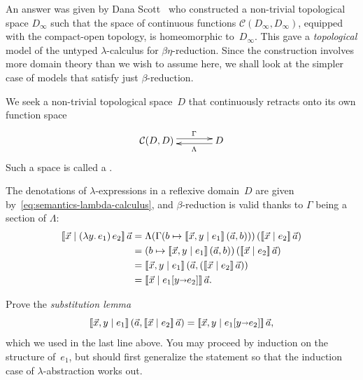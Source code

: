 An answer was given by Dana Scott~ who
constructed a non-trivial topological space $D_\infty$ such that the
space of continuous functions $\mathcal{C}(D_\infty, D_\infty)$,
equipped with the compact-open topology, is homeomorphic
to~$D_\infty$. This gave a \emph{topological} model of the untyped
$\lambda$-calculus for $\beta\eta$-reduction. Since the construction
involves more domain theory than we wish to assume here, we shall look
at the simpler case of models that satisfy just $\beta$-reduction.

We seek a non-trivial topological space~$D$ that continuously retracts onto its own function space
%
\begin{equation}
  \label{eq:section-retraction-D}
  \xymatrix{
    **[l]{\mathcal{C}(D, D)}
    \ar@<+0.25em>[r]^{\Gamma}
    &
    {D}
    \ar@<+0.25em>[l]^{\Lambda}
  }
\end{equation}
%
Such a space is called a .


The denotations of $\lambda$-expressions in a reflexive domain~$D$ are given by~\eqref{eq:semantics-lambda-calculus}, and $\beta$-reduction is valid thanks to $\Gamma$ being a section of $\Lambda$:
%
\begin{align*}
  \sem{\vec{x} \ctx (\lam{y} e_1) \, e_2} \, \vec{a}
  &= \Lambda(\Gamma(b \mapsto \sem{\vec{x}, y \ctx e_1} \, (\vec{a}, b))) 
     \, (\sem{\vec{x} \ctx e_2} \, \vec{a}) \\
  &= (b \mapsto \sem{\vec{x}, y \ctx e_1} \, (\vec{a}, b))
     \, (\sem{\vec{x} \ctx e_2} \, \vec{a}) \\
  &= \sem{\vec{x}, y \ctx e_1} \, (\vec{a}, (\sem{\vec{x} \ctx e_2} \, \vec{a})) \\
  &= \sem{\vec{x} \ctx \subst{e_1}{y \subto e_2}} \, \vec{a}.
\end{align*}

\begin{exercise}
  Prove the \emph{substitution lemma}
  \begin{equation*}
    [\![\vec{x}, y \mid e_1]\!] \, (\vec{a}, [\![\vec{x} \mid e_2]\!] \, \vec{a}) =
    [\![\vec{x}, y \mid e_1[y {\shortrightarrow} e_2]]\!] \, \vec{a},
  \end{equation*}
  which we used in the last line above. You may proceed by induction on the structure of~$e_1$, but should first generalize the statement so that the induction case of $\lambda$-abstraction works out.
\end{exercise}


